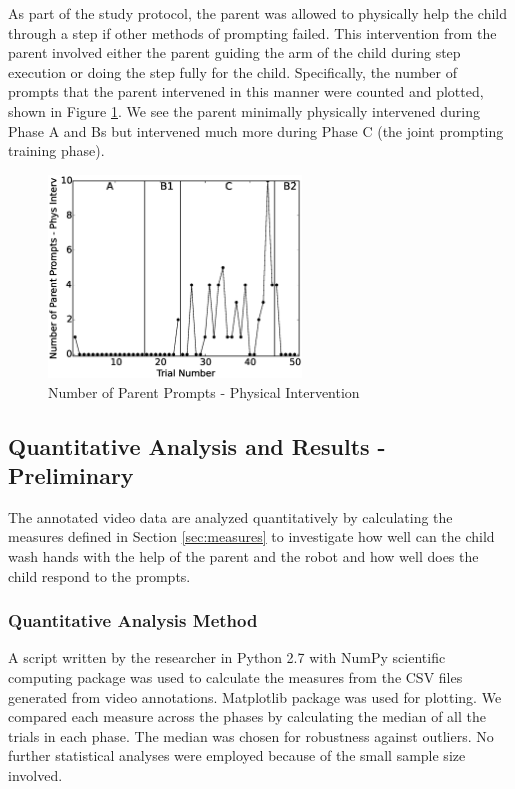 As part of the study protocol, the parent was allowed to physically help the child through a step if other methods of prompting failed.  This intervention from the parent involved either the parent guiding the arm of the child during step execution or doing the step fully for the child.  Specifically, the number of prompts that the parent intervened in this manner were counted and plotted, shown in Figure \ref{fig:7NumberofParentPrompts-PhysInterv}.  We see the parent minimally physically intervened during Phase A and Bs but intervened much more during Phase C (the joint prompting training phase).
\begin{figure} [h]
	\centering
	\includegraphics[width=0.6\textwidth]{./img/data_analysis/7NumberofParentPrompts-PhysInterv.eps}
	\caption{Number of Parent Prompts - Physical Intervention}
	\label{fig:7NumberofParentPrompts-PhysInterv}
\end{figure}


\subsection{Quantitative Analysis and Results - Preliminary}
\label{sec:QuantitativeData_results}
The annotated video data are analyzed quantitatively by calculating the measures defined in Section \ref{sec:measures} to investigate how well can the child wash hands with the help of the parent and the robot and how well does the child respond to the prompts.

\subsubsection{Quantitative Analysis Method}
A script written by the researcher in Python 2.7 with NumPy scientific computing package was used to calculate the measures from the CSV files generated from video annotations.  Matplotlib package was used for plotting.  We compared each measure across the phases by calculating the median of all the trials in each phase.  The median was chosen for robustness against outliers.  No further statistical analyses were employed because of the small sample size involved.

